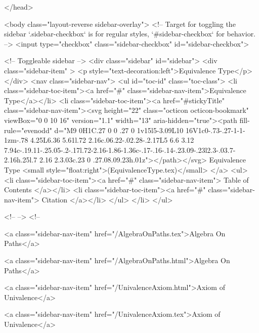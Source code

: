 </head>


  <body class="layout-reverse sidebar-overlay">
    <!-- Target for toggling the sidebar `.sidebar-checkbox` is for regular
     styles, `#sidebar-checkbox` for behavior. -->
<input type="checkbox" class="sidebar-checkbox" id="sidebar-checkbox">

<!-- Toggleable sidebar -->
<div class="sidebar" id="sidebar">
  <div class="sidebar-item" >
    <p style="text-decoration:left">Equivalence Type</p>
  </div>
  <nav class="sidebar-nav">
    <ul id="toc-id" class="toc-class">
  <li class="sidebar-toc-item"><a href="#" class="sidebar-nav-item">Equivalence Type</a></li>
  <li class="sidebar-toc-item"><a href="#stickyTitle" class="sidebar-nav-item"><svg height="22" class="octicon octicon-bookmark" viewBox="0 0 10 16" version="1.1" width="13" aria-hidden="true"><path fill-rule="evenodd" d="M9 0H1C.27 0 0 .27 0 1v15l5-3.09L10 16V1c0-.73-.27-1-1-1zm-.78 4.25L6.36 5.61l.72 2.16c.06.22-.02.28-.2.17L5 6.6 3.12 7.94c-.19.11-.25.05-.2-.17l.72-2.16-1.86-1.36c-.17-.16-.14-.23.09-.23l2.3-.03.7-2.16h.25l.7 2.16 2.3.03c.23 0 .27.08.09.23h.01z"></path></svg> Equivalence Type <small style="float:right">(EquivalenceType.tex)</small>
</a>
    <ul>
      <li class="sidebar-toc-item"><a href="#" class="sidebar-nav-item"> Table of Contents </a></li>
      <li class="sidebar-toc-item"><a href="#" class="sidebar-nav-item"> Citation </a></li>
    </ul>
  </li>
</ul>


    <!--  -->
    <!-- 
      
    
      
    
      
    
      
        
      
    
      
        
          <a class="sidebar-nav-item" href="/AlgebraOnPaths.tex">Algebra On Paths</a>
        
      
    
      
        
          <a class="sidebar-nav-item" href="/AlgebraOnPaths.html">Algebra On Paths</a>
        
      
    
      
        
          <a class="sidebar-nav-item" href="/UnivalenceAxiom.html">Axiom of Univalence</a>
        
      
    
      
        
          <a class="sidebar-nav-item" href="/UnivalenceAxiom.tex">Axiom of Univalence</a>
        
